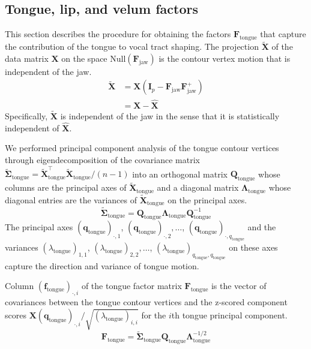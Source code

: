 \documentclass[preprint]{JASAnew}
\begin{document}
\subsection{Tongue, lip, and velum factors}
\label{subsec:residfactors}

This section describes the procedure for obtaining the factors $\mathbf{F}_\text{tongue}$ that capture the contribution of the tongue to vocal tract shaping. 
% 
The projection $\mathbf{\tilde{X}}$ of the data matrix $\mathbf{X}$ on the space $\mathrm{Null}(\mathbf{F}_\text{jaw})$ is the contour vertex motion that is independent of the jaw.
%
\begin{align} \label{eq:XXX}
\mathbf{\tilde{X}} 
&= \mathbf{X} \left( \mathbf{I}_p - \mathbf{F}_\text{jaw}\mathbf{F}_\text{jaw}^+ \right) \\
&= \mathbf{X} - \mathbf{\hat{X}} 
\end{align}
%
Specifically, $\mathbf{\tilde{X}}$ is independent of the jaw in the sense that it is statistically independent of $\mathbf{\hat{X}}$. 
%





We performed principal component analysis of the tongue contour vertices through eigendecomposition of the covariance matrix $\boldsymbol{\tilde{\Sigma}}_\text{tongue} = \mathbf{\tilde{X}}_\text{tongue}^\intercal \mathbf{\tilde{X}}_\text{tongue}/(n-1)$ into an orthogonal matrix $\mathbf{Q}_\text{tongue}$ whose columns are the principal axes of $\mathbf{\tilde{X}}_\text{tongue}$ and a diagonal matrix $\boldsymbol{\Lambda}_\text{tongue}$ whose diagonal entries are the variances of $\mathbf{\tilde{X}}_\text{tongue}$ on the principal axes.
% 
\begin{equation}
\boldsymbol{\tilde{\Sigma}}_\text{tongue} = \mathbf{Q}_\text{tongue} \boldsymbol{\Lambda}_\text{tongue} \mathbf{Q}_\text{tongue}^{-1}
\end{equation}
%
The principal axes $(\mathbf{q}_\text{tongue})_{\cdot,1}$, $(\mathbf{q}_\text{tongue})_{\cdot,2}, \ldots$, $(\mathbf{q}_\text{tongue})_{\cdot,q_\text{tongue}}$ and the variances $(\lambda_\text{tongue})_{1,1}$, $(\lambda_\text{tongue})_{2,2}, \ldots$, $(\lambda_\text{tongue})_{q_\text{tongue},q_\text{tongue}}$ on these axes capture the direction and variance of tongue motion.


Column $(\mathbf{f}_\text{tongue})_{\cdot,i}$ of the tongue factor matrix $\mathbf{F}_\text{tongue}$ is the vector of covariances between the tongue contour vertices and the z-scored component scores $\mathbf{X} (\mathbf{q}_\text{tongue})_{\cdot,i} / \sqrt{(\lambda_\text{tongue})_{i,i}}$ for the $i$th tongue principal component. 
%
\begin{equation}
\mathbf{F}_\text{tongue}
 = \boldsymbol{\tilde{\Sigma}}_\text{tongue} \mathbf{Q}_\text{tongue} \boldsymbol{\Lambda}_\text{tongue}^{-1/2}
\end{equation}
\end{document}
